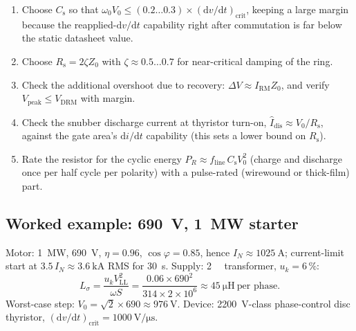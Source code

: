 \documentclass[11pt,a4paper]{article}
\begin{document}
\begin{enumerate}
  \item Choose $C_\mathrm{s}$ so that
        $\omega_0 V_0 \le (0.2\ldots0.3)\times
        (\mathrm{d}v/\mathrm{d}t)_\mathrm{crit}$,
        keeping a large margin because the reapplied-$\mathrm{d}v/\mathrm{d}t$
        capability right after commutation is far below the static datasheet
        value.
  \item Choose $R_\mathrm{s} = 2\zeta Z_0$ with $\zeta \approx 0.5\ldots0.7$
        for near-critical damping of the ring.
  \item Check the additional overshoot due to recovery:
        $\Delta V \approx I_\mathrm{RM} Z_0$, and verify
        $V_\mathrm{peak} \le V_\mathrm{DRM}$ with margin.
  \item Check the snubber discharge current at thyristor turn-on,
        $\hat{I}_\mathrm{dis} \approx V_0 / R_\mathrm{s}$, against the gate
        area's $\mathrm{d}i/\mathrm{d}t$ capability (this sets a lower bound
        on $R_\mathrm{s}$).
  \item Rate the resistor for the cyclic energy
        $P_{R} \approx f_\mathrm{line}\, C_\mathrm{s} V_0^2$
        (charge and discharge once per half cycle per polarity) with a
        pulse-rated (wirewound or thick-film) part.
\end{enumerate}

\subsection{Worked example: \SI{690}{\volt}, \SI{1}{\mega\watt} starter}

Motor: \SI{1}{\mega\watt}, \SI{690}{\volt}, $\eta = 0.96$,
$\cos\varphi = 0.85$, hence $I_N \approx \SI{1025}{\ampere}$; current-limit
start at $3.5\,I_N \approx \SI{3.6}{\kilo\ampere}$ RMS for
\SI{30}{\second}. Supply: \SI{2}{\mega\voltampere} transformer,
$u_k = 6\,\%$:
\begin{equation}
  L_\sigma = \frac{u_k V_\mathrm{LL}^2}{\omega S}
  = \frac{0.06 \times 690^2}{314 \times 2\times10^6}
  \approx \SI{45}{\micro\henry}\ \text{per phase}.
\end{equation}
Worst-case step: $V_0 = \sqrt{2}\times 690 \approx \SI{976}{\volt}$.
Device: \SI{2200}{\volt}-class phase-control disc thyristor,
$(\mathrm{d}v/\mathrm{d}t)_\mathrm{crit} = \SI{1000}{\volt\per\micro\second}$.
\end{document}
